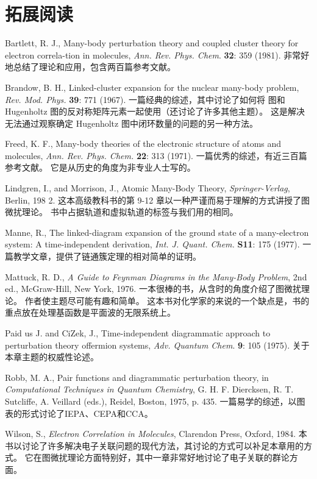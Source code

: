 \theendnotes
{}

\section*{拓展阅读}

Bartlett, R. J., Many-body perturbation theory and coupled cluster theory for electron correla-tion in molecules, \textit{Ann. Rev. Phys. Chem}. \textbf{32}: 359 (1981). 非常好地总结了理论和应用，包含两百篇参考文献。

Brandow, B. H., Linked-cluster expansion for the nuclear many-body problem, \textit{Rev. Mod. Phys.} \textbf{39}: 771 (1967). 一篇经典的综述，其中讨论了如何将 图和 Hugenholtz 图的反对称矩阵元素一起使用（还讨论了许多其他主题）。 这是解决无法通过观察确定 Hugenholtz 图中闭环数量的问题的另一种方法。

Freed, K. F., Many-body theories of the electronic structure of atoms and molecules, \textit{Ann. Rev. Phys. Chem.} \textbf{22}: 313 (1971). 一篇优秀的综述，有近三百篇参考文献。 它是从历史的角度为非专业人士写的。

Lindgren, I., and Morrison, J., Atomic Many-Body Theory, \textit{Springer-Verlag}, Berlin, 198 2. 这本高级教科书的第 9-12 章以一种严谨而易于理解的方式讲授了图微扰理论。 书中占据轨道和虚拟轨道的标签与我们用的相同。

Manne, R., The linked-diagram expansion of the ground state of a many-electron system: A time-independent derivation, \textit{Int. J. Quant. Chem.} \textbf{S11}: 175 (1977). 一篇教学文章，提供了链通簇定理的相对简单的证明。

Mattuck, R. D., \textit{A Guide to Feynman Diagrams in the Many-Body Problem}, 2nd ed., McGraw-Hill, New York, 1976. 一本很棒的书，从含时的角度介绍了图微扰理论。 作者使主题尽可能有趣和简单。 这本书对化学家的来说的一个缺点是，书的重点放在处理基函数是平面波的无限系统上。

Paid us J. and CiZek, J., Time-independent diagrammatic approach to perturbation theory offermion systems, \textit{Adv. Quantum Chem}. \textbf{9}: 105 (1975). 关于本章主题的权威性论述。

Robb, M. A., Pair functions and diagrammatic perturbation theory, in \textit{Computational Techniques in Quantum Chemistry}, G. H. F. Diercksen, R. T. Sutcliffe, A. Veillard (eds.), Reidel, Boston, 1975, p. 435. 一篇易学的综述，以图表的形式讨论了IEPA、CEPA和CCA。

Wilson, S., \textit{Electron Correlation in Molecules}, Clarendon Press, Oxford, 1984. 本书以讨论了许多解决电子关联问题的现代方法，其讨论的方式可以补足本章用的方式。 它在图微扰理论方面特别好，其中一章非常好地讨论了电子关联的群论方面。

